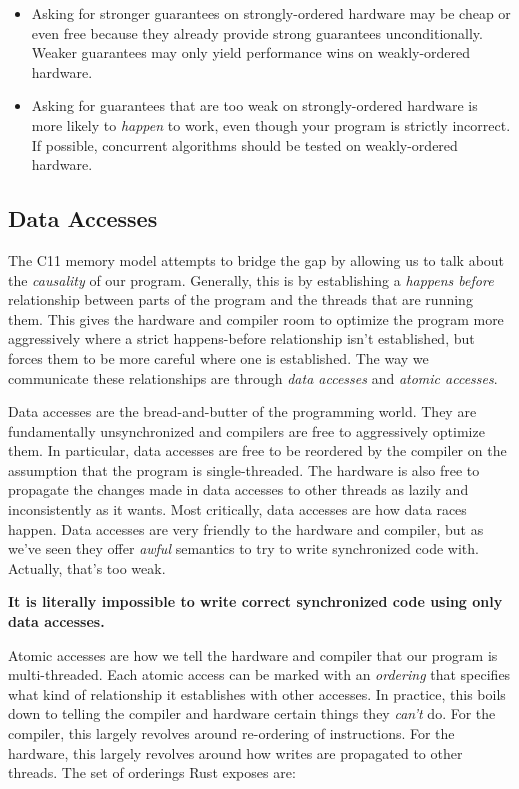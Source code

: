 \documentclass[a4paper,]{book}
\begin{document}
\begin{itemize}
\item
  Asking for stronger guarantees on strongly-ordered hardware may be
  cheap or even free because they already provide strong guarantees
  unconditionally. Weaker guarantees may only yield performance wins on
  weakly-ordered hardware.
\item
  Asking for guarantees that are too weak on strongly-ordered hardware
  is more likely to \emph{happen} to work, even though your program is
  strictly incorrect. If possible, concurrent algorithms should be
  tested on weakly-ordered hardware.
\end{itemize}

\subsection{Data Accesses}\label{data-accesses}

The C11 memory model attempts to bridge the gap by allowing us to talk
about the \emph{causality} of our program. Generally, this is by
establishing a \emph{happens before} relationship between parts of the
program and the threads that are running them. This gives the hardware
and compiler room to optimize the program more aggressively where a
strict happens-before relationship isn't established, but forces them to
be more careful where one is established. The way we communicate these
relationships are through \emph{data accesses} and \emph{atomic
accesses}.

Data accesses are the bread-and-butter of the programming world. They
are fundamentally unsynchronized and compilers are free to aggressively
optimize them. In particular, data accesses are free to be reordered by
the compiler on the assumption that the program is single-threaded. The
hardware is also free to propagate the changes made in data accesses to
other threads as lazily and inconsistently as it wants. Most critically,
data accesses are how data races happen. Data accesses are very friendly
to the hardware and compiler, but as we've seen they offer \emph{awful}
semantics to try to write synchronized code with. Actually, that's too
weak.

\textbf{It is literally impossible to write correct synchronized code
using only data accesses.}

Atomic accesses are how we tell the hardware and compiler that our
program is multi-threaded. Each atomic access can be marked with an
\emph{ordering} that specifies what kind of relationship it establishes
with other accesses. In practice, this boils down to telling the
compiler and hardware certain things they \emph{can't} do. For the
compiler, this largely revolves around re-ordering of instructions. For
the hardware, this largely revolves around how writes are propagated to
other threads. The set of orderings Rust exposes are:
\end{document}
